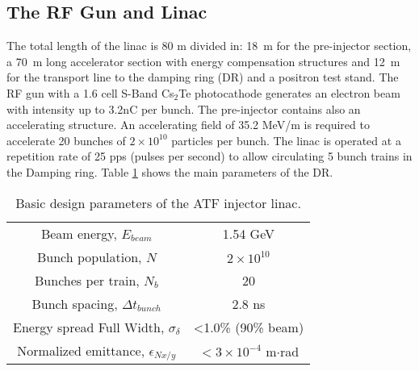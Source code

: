 {{\subsection{The RF Gun and Linac}
The total length of the linac is 80 m divided in: 18~m for the pre-injector section, a 70~m long accelerator section with energy compensation structures and 12~m for the transport line to the damping ring (DR) and a positron test stand.
The RF gun with a 1.6 cell S-Band Cs$_2$Te photocathode generates an electron beam with intensity up to 3.2nC per bunch. The pre-injector contains also an accelerating structure. An accelerating field of 35.2 MeV/m is required to accelerate 20 bunches of $2\times10^{10}$ particles per bunch. The linac is operated at a repetition rate of 25 pps (pulses per second) to allow circulating 5 bunch trains in the Damping ring. Table \ref{t:linac} shows the main parameters of the DR.
\begin{table}[hbt]
\centering
 \begin{tabular}{|c|c|}\hline
 Beam energy, $E_{beam}$& 1.54 GeV \\
 Bunch population, $N$& $2\times10^{10}$ \\
 Bunches per train, $N_b$ & 20 \\
 Bunch spacing, $\Delta t_{bunch}$ & 2.8 ns\\
 Energy spread Full Width, $\sigma_\delta$ & <1.0\% (90\% beam)\\
 Normalized emittance, $\epsilon_{Nx/y}$ & $< 3\times 10^{-4}$ m$\cdot$rad\\\hline
 \end{tabular}
 \caption{Basic design parameters of the ATF injector linac.}\label{t:linac}
\end{table}
}}

